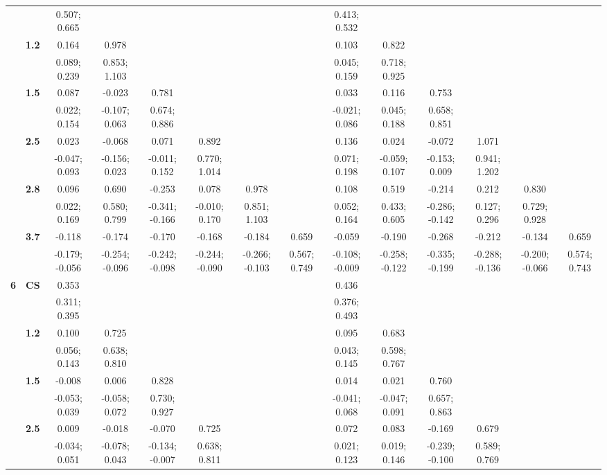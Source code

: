 \begin{landscape}
\begin{table}[!htp]
\begin{center}
\begin{tabular}{>{\bfseries}c>{\bfseries}ccccccccccccc}
 &  & 0.507; 0.665 &  &  &  &  &  & 0.413; 0.532 &  &  &  &  & \\[0.7ex]
 & 1.2 & 0.164 & 0.978 &  &  &  &  & 0.103 & 0.822 &  &  &  & \\
 &  & 0.089; 0.239 & 0.853; 1.103 &  &  &  &  & 0.045; 0.159 & 0.718; 0.925 &  &  &  & \\[0.7ex]
 & 1.5 & 0.087 & -0.023 & 0.781 &  &  &  & 0.033 & 0.116 & 0.753 &  &  & \\
 &  & 0.022; 0.154 & -0.107; 0.063 & 0.674; 0.886 &  &  &  & -0.021; 0.086 & 0.045; 0.188 & 0.658; 0.851 &  &  & \\[0.7ex]
 & 2.5 & 0.023 & -0.068 & 0.071 & 0.892 &  &  & 0.136 & 0.024 & -0.072 & 1.071 &  & \\
 &  & -0.047; 0.093 & -0.156; 0.023 & -0.011; 0.152 & 0.770; 1.014 &  &  & 0.071; 0.198 & -0.059; 0.107 & -0.153; 0.009 & 0.941; 1.202 &  & \\[0.7ex]
 & 2.8 & 0.096 & 0.690 & -0.253 & 0.078 & 0.978 &  & 0.108 & 0.519 & -0.214 & 0.212 & 0.830 & \\
 &  & 0.022; 0.169 & 0.580; 0.799 & -0.341; -0.166 & -0.010; 0.170 & 0.851; 1.103 &  & 0.052; 0.164 & 0.433; 0.605 & -0.286; -0.142 & 0.127; 0.296 & 0.729; 0.928 & \\[0.7ex]
 & 3.7 & -0.118 & -0.174 & -0.170 & -0.168 & -0.184 & 0.659 & -0.059 & -0.190 & -0.268 & -0.212 & -0.134 & 0.659\\
 &  & -0.179; -0.056 & -0.254; -0.096 & -0.242; -0.098 & -0.244; -0.090 & -0.266; -0.103 & 0.567; 0.749 & -0.108; -0.009 & -0.258; -0.122 & -0.335; -0.199 & -0.288; -0.136 & -0.200; -0.066 & 0.574; 0.743\\[0.7ex]
 \midrule
6 & CS & 0.353 &  &  &  &  &  & 0.436 &  &  &  &  & \\
 &  & 0.311; 0.395 &  &  &  &  &  & 0.376; 0.493 &  &  &  &  & \\[0.7ex]
 & 1.2 & 0.100 & 0.725 &  &  &  &  & 0.095 & 0.683 &  &  &  & \\
 &  & 0.056; 0.143 & 0.638; 0.810 &  &  &  &  & 0.043; 0.145 & 0.598; 0.767 &  &  &  & \\[0.7ex]
 & 1.5 & -0.008 & 0.006 & 0.828 &  &  &  & 0.014 & 0.021 & 0.760 &  &  & \\
 &  & -0.053; 0.039 & -0.058; 0.072 & 0.730; 0.927 &  &  &  & -0.041; 0.068 & -0.047; 0.091 & 0.657; 0.863 &  &  & \\[0.7ex]
 & 2.5 & 0.009 & -0.018 & -0.070 & 0.725 &  &  & 0.072 & 0.083 & -0.169 & 0.679 &  & \\
 &  & -0.034; 0.051 & -0.078; 0.043 & -0.134; -0.007 & 0.638; 0.811 &  &  & 0.021; 0.123 & 0.019; 0.146 & -0.239; -0.100 & 0.589; 0.769 &  & \\[0.7ex]

\end{tabular}
\end{center}
\end{table}
\end{landscape}
